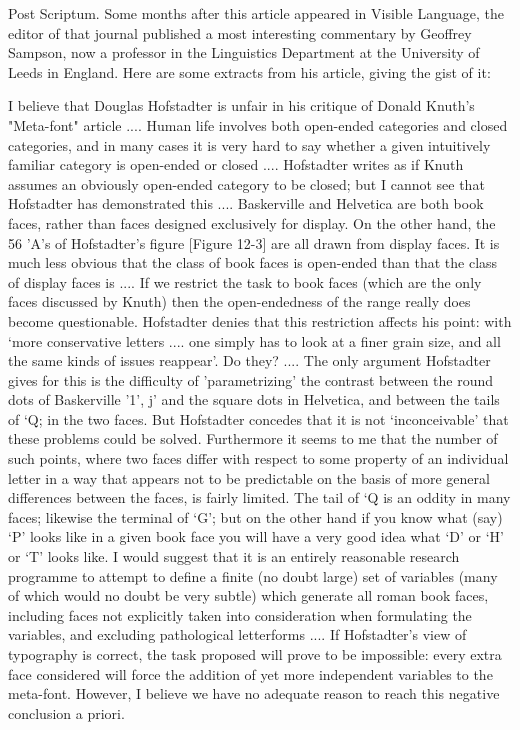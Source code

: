 Post Scriptum.
        Some months after this article appeared in Visible Language, the editor of that
journal published a most interesting commentary by Geoffrey Sampson, now a professor
in the Linguistics Department at the University of Leeds in England. Here are some
extracts from his article, giving the gist of it:

           I believe that Douglas Hofstadter is unfair in his critique of Donald Knuth's
  "Meta-font" article .... Human life involves both open-ended categories and closed
  categories, and in many cases it is very hard to say whether a given intuitively
  familiar category is open-ended or closed .... Hofstadter writes as if Knuth assumes
  an obviously open-ended category to be closed; but I cannot see that Hofstadter has
  demonstrated this .... Baskerville and Helvetica are both book faces, rather than
  faces designed exclusively for display. On the other hand, the 56 'A's of
  Hofstadter's figure [Figure 12-3] are all drawn from display faces. It is much less
  obvious that the class of book faces is open-ended than that the class of display
  faces is ....
           If we restrict the task to book faces (which are the only faces discussed by
  Knuth) then the open-endedness of the range really does become questionable.
  Hofstadter denies that this restriction affects his point: with `more conservative
  letters .... one simply has to look at a finer grain size, and all the same kinds of
  issues reappear'. Do they? ....
           The only argument Hofstadter gives for this is the difficulty of
  'parametrizing' the contrast between the round dots of Baskerville '1', j' and the
  square dots in Helvetica, and between the tails of `Q; in the two faces. But
  Hofstadter concedes that it is not `inconceivable' that these problems could be
  solved. Furthermore it seems to me that the number of such points, where two faces
  differ with respect to some property of an individual letter in a way that appears not
  to be predictable on the basis of more general differences between the faces, is
  fairly limited. The tail of `Q is an oddity in many faces; likewise the terminal of
  `G'; but on the other hand if you know what (say) `P' looks like in a given book face
  you will have a very good idea what `D' or `H' or `T' looks like.
           I would suggest that it is an entirely reasonable research programme to
  attempt to define a finite (no doubt large) set of variables (many of which would no
  doubt be very subtle) which generate all roman book faces, including faces not
  explicitly taken into consideration when formulating the variables, and excluding
  pathological letterforms .... If Hofstadter's view of typography is correct, the task
  proposed will prove to be impossible: every extra face considered will force the
  addition of yet more independent variables to the meta-font. However, I believe we
  have no adequate reason to reach this negative conclusion a priori.

